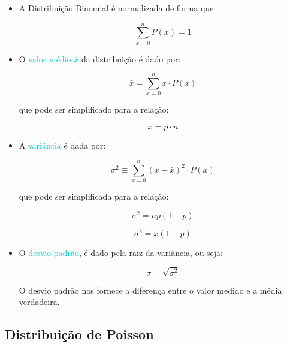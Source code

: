 \documentclass[11pt,a4paper]{article}
\begin{document}
		\begin{itemize}
			\item A Distribuição Binomial é normalizada de forma que:

				\begin{equation}
					\sum_{x = 0}^{n} P(x) = 1
				\end{equation}

			\item O \textcolor{DarkTurquoise}{valor médio $\bar{x}$} da distribuição é dado por:
				
				\begin{equation}
					\bar{x} = \sum_{x = 0}^{n} x \cdot P(x)
				\end{equation}

				que pode ser simplificado para a relação:

				\begin{equation}
					\bar{x} = p \cdot n
				\end{equation}
			
			\item A \textcolor{DarkTurquoise}{variância} é dada por:
			
				\begin{equation}
					\sigma^2 \equiv \sum_{x = 0}^{n} (x - \bar{x})^2 \cdot P(x)
				\end{equation}

			que pode ser simplificada para a relação:

				\begin{equation}
					\sigma^2 = np(1 - p)
				\end{equation}

				\begin{equation}
					\sigma^2 = \bar{x}(1 - p)
				\end{equation}

			\item O \textcolor{DarkTurquoise}{desvio padrão}, é dado pela raiz da variância, ou seja:
			
				\begin{equation}
					\sigma = \sqrt{\sigma^2}
				\end{equation}

			O desvio padrão nos fornece a diferença entre o valor medido e a média verdadeira. 

		\end{itemize}

	\subsection*{Distribuição de Poisson}
\end{document}
